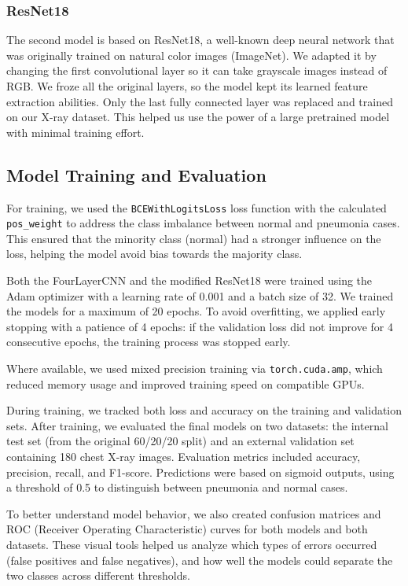 \documentclass[a4paper,11pt]{article}
\begin{document}
\subsubsection{ResNet18}
The second model is based on ResNet18, a well-known deep neural network that was originally trained on natural color images (ImageNet). We adapted it by changing the first convolutional layer so it can take grayscale images instead of RGB. We froze all the original layers, so the model kept its learned feature extraction abilities. Only the last fully connected layer was replaced and trained on our X-ray dataset. This helped us use the power of a large pretrained model with minimal training effort.

\subsection{Model Training and Evaluation}

For training, we used the \texttt{BCEWithLogitsLoss} loss function with the calculated \texttt{pos\_weight} to address the class imbalance between normal and pneumonia cases. This ensured that the minority class (normal) had a stronger influence on the loss, helping the model avoid bias towards the majority class.

Both the FourLayerCNN and the modified ResNet18 were trained using the Adam optimizer with a learning rate of 0.001 and a batch size of 32. We trained the models for a maximum of 20 epochs. To avoid overfitting, we applied early stopping with a patience of 4 epochs: if the validation loss did not improve for 4 consecutive epochs, the training process was stopped early.

\vspace{0.2cm}
Where available, we used mixed precision training via \texttt{torch.cuda.amp}, which reduced memory usage and improved training speed on compatible GPUs.

\vspace{0.2cm}
During training, we tracked both loss and accuracy on the training and validation sets. After training, we evaluated the final models on two datasets: the internal test set (from the original 60/20/20 split) and an external validation set containing 180 chest X-ray images. Evaluation metrics included accuracy, precision, recall, and F1-score. Predictions were based on sigmoid outputs, using a threshold of 0.5 to distinguish between pneumonia and normal cases.

\vspace{0.2cm}
To better understand model behavior, we also created confusion matrices and ROC (Receiver Operating Characteristic) curves for both models and both datasets. These visual tools helped us analyze which types of errors occurred (false positives and false negatives), and how well the models could separate the two classes across different thresholds.
\end{document}
